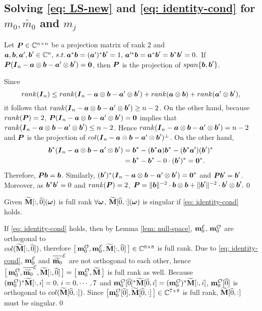 \subsection{Solving \eqref{eq: LS-new} and \eqref{eq: identity-cond} for $m_0,\widetilde{m_0}$ and $m_j$}\label{app: solving}
\begin{lemma}\label{lem: null-space}
Let $\V{P}\in\mathbb{C}^{n\times n}$ be a projection matrix of rank $2$ and $\V{a},\V{b},\V{a}',\V{b}'\in\mathbb{C}^n,\, s.t.\, \V{a}^*\V{b} = (\V{a}')^*\V{b}'=1,\, \V{a}'^*\V{b} = \V{a}^*\V{b}' = \V{b}^*\V{b}' = 0.$ If $\V{P}(\V{I}_n - \V{a}\otimes\V{b} - \V{a}'\otimes\V{b}' ) = \V{0}$, then $\V{P}$ is the projection of $span\{\V{b},\V{b}'\}$.
\end{lemma}
Since $$rank(\V{I}_n) \leq rank(\V{I}_n-\V{a}\otimes\V{b}-\V{a}'\otimes\V{b}') + rank(\V{a}\otimes\V{b}) + rank(\V{a}'\otimes\V{b}'),$$
it follows that $rank(\V{I}_n-\V{a}\otimes\V{b}-\V{a}'\otimes\V{b}')\geq n - 2$. On the other hand, because $rank(\V{P}) = 2$, $\V{P}(\V{I}_n - \V{a}\otimes\V{b} - \V{a}'\otimes\V{b}' ) = \V{0}$ implies that $rank(\V{I}_n-\V{a}\otimes\V{b}-\V{a}'\otimes\V{b}')\leq n - 2$. Hence $rank(\V{I}_n-\V{a}\otimes\V{b}-\V{a}'\otimes\V{b}') = n - 2$ and $\V{P}$ is the projection of $col(\V{I}_n-\V{a}\otimes\V{b}-\V{a}'\otimes\V{b}')^\bot$. On the other hand,
\begin{align*}
\V{b}^*(\V{I}_n-\V{a}\otimes\V{b}-\V{a}'\otimes\V{b}')
&= \V{b}^* - (\V{b}^*\V{a})\V{b}^* - (\V{b}^*\V{a}')(\V{b}')^*\\
&= \V{b}^* - \V{b}^* - 0\cdot (\V{b}')^* = \V{0}^*.
\end{align*}
Therefore, $\V{P}\V{b} = \V{b}$.
Similarly, $(\V{b}')^* (\V{I}_n-\V{a}\otimes\V{b}-\V{a}'\otimes\V{b}')=\V{0}^*$ and $\V{P}\V{b}' = \V{b}'$. Moreover, as $\V{b}^*\V{b}' = 0$ and $rank(\V{P}) = 2$, $\V{P} = \Vert\V{b}\Vert^{-2}\cdot\V{b}\otimes\V{b} + \Vert\V{b}'\Vert^{-2}\cdot\V{b}'\otimes\V{b}'.$\qed

\begin{lemma}
Given $\M[:,\widehat{0}](\V{\omega})$ is full rank $\forall \V{\omega}$, $\M[\widehat{0},:](\V{\omega})$ is singular if \eqref{eq: identity-cond} holds.
\end{lemma}
If \eqref{eq: identity-cond} holds, then by Lemma \ref{lem: null-space}, $\meven,\,\modd$ are orthogonal to \\$col(\M[:,\widehat{0}])$, therefore $\big[\,\modd,\meven,\M[:,\widehat{0}]\,\big]\in\mathbb{C}^{8\times 8}$ is full rank. Due to \eqref{eq: identity-cond}, $\meven$ and $\mteven$ are not orthogonal to each other, hence $\big[\,\modd,\mteven,\M[:,\widehat{0}]\,\big] = \big[\,\modd, \M\,\big]$ is full rank as well. Because $(\modd)^*\M[:, i] = 0,\,i= 0,\cdots,7$ and $\modd[\widehat{0}]^*\M[\widehat{0}, i] = (\modd)^*\M[:,i]$, $\modd[\widehat{0}]$ is orthogonal to $col(\M[\widehat{0},:])$. Since $\big[ \modd[\widehat{0}], \M[\widehat{0},:]\,\big]\in\mathbb{C}^{7\times 8}$ is full rank, $\M[\widehat{0},:]$ must be singular.\qed\\[1em]

